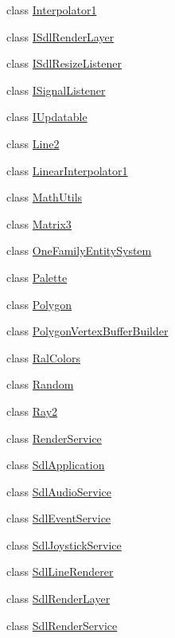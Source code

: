 \begin{DoxyCompactItemize}
class \hyperlink{classastu_1_1Interpolator1}{Interpolator1}
\item 
class \hyperlink{classastu_1_1ISdlRenderLayer}{I\+Sdl\+Render\+Layer}
\item 
class \hyperlink{classastu_1_1ISdlResizeListener}{I\+Sdl\+Resize\+Listener}
\item 
class \hyperlink{classastu_1_1ISignalListener}{I\+Signal\+Listener}
\item 
class \hyperlink{classastu_1_1IUpdatable}{I\+Updatable}
\item 
class \hyperlink{classastu_1_1Line2}{Line2}
\item 
class \hyperlink{classastu_1_1LinearInterpolator1}{Linear\+Interpolator1}
\item 
class \hyperlink{classastu_1_1MathUtils}{Math\+Utils}
\item 
class \hyperlink{classastu_1_1Matrix3}{Matrix3}
\item 
class \hyperlink{classastu_1_1OneFamilyEntitySystem}{One\+Family\+Entity\+System}
\item 
class \hyperlink{classastu_1_1Palette}{Palette}
\item 
class \hyperlink{classastu_1_1Polygon}{Polygon}
\item 
class \hyperlink{classastu_1_1PolygonVertexBufferBuilder}{Polygon\+Vertex\+Buffer\+Builder}
\item 
class \hyperlink{classastu_1_1RalColors}{Ral\+Colors}
\item 
class \hyperlink{classastu_1_1Random}{Random}
\item 
class \hyperlink{classastu_1_1Ray2}{Ray2}
\item 
class \hyperlink{classastu_1_1RenderService}{Render\+Service}
\item 
class \hyperlink{classastu_1_1SdlApplication}{Sdl\+Application}
\item 
class \hyperlink{classastu_1_1SdlAudioService}{Sdl\+Audio\+Service}
\item 
class \hyperlink{classastu_1_1SdlEventService}{Sdl\+Event\+Service}
\item 
class \hyperlink{classastu_1_1SdlJoystickService}{Sdl\+Joystick\+Service}
\item 
class \hyperlink{classastu_1_1SdlLineRenderer}{Sdl\+Line\+Renderer}
\item 
class \hyperlink{classastu_1_1SdlRenderLayer}{Sdl\+Render\+Layer}
\item 
class \hyperlink{classastu_1_1SdlRenderService}{Sdl\+Render\+Service}
\item 

\end{DoxyCompactItemize}
